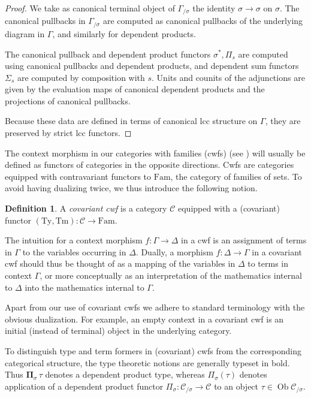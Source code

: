 \documentclass[a4paper]{article}
\theoremstyle{remark}
\theoremstyle{definition}
\newtheorem{definition}[theorem]{Definition}
\begin{document}
\begin{proof}
  We take as canonical terminal object of $\Gamma_{/ \sigma}$ the identity $\sigma \rightarrow \sigma$ on $\sigma$.
  The canonical pullbacks in $\Gamma_{/ \sigma}$ are computed as canonical pullbacks of the underlying diagram in $\Gamma$, and similarly for dependent products. 
  
  The canonical pullback and dependent product functors $\sigma^*, \Pi_s$ are computed using canonical pullbacks and dependent products, and dependent sum functors $\Sigma_s$ are computed by composition with $s$.
  Units and counits of the adjunctions are given by the evaluation maps of canonical dependent products and the projections of canonical pullbacks.

  Because these data are defined in terms of canonical lcc structure on $\Gamma$, they are preserved by strict lcc functors.
\end{proof}

The context morphism in our categories with families (cwfs) (see \cite{internal-type-theory}) will usually be defined as functors of categories in the opposite directions.
Cwfs are categories equipped with contravariant functors to $\mathrm{Fam}$, the category of families of sets.
To avoid having dualizing twice, we thus introduce the following notion.
\begin{definition}
  A \emph{covariant cwf} is a category $\mathcal{C}$ equipped with a (covariant) functor $(\mathrm{Ty}, \mathrm{Tm}) : \mathcal{C} \rightarrow \mathrm{Fam}$.
\end{definition}
The intuition for a context morphism $f : \Gamma \rightarrow \Delta$ in a cwf is an assignment of terms in $\Gamma$ to the variables occurring in $\Delta$.
Dually, a morphism $f : \Delta \rightarrow \Gamma$ in a covariant cwf should thus be thought of as a mapping of the variables in $\Delta$ to terms in context $\Gamma$, or more conceptually as an interpretation of the mathematics internal to $\Delta$ into the mathematics internal to $\Gamma$.

Apart from our use of covariant cwfs we adhere to standard terminology with the obvious dualization.
For example, an empty context in a covariant cwf is an initial (instead of terminal) object in the underlying category.

To distinguish type and term formers in (covariant) cwfs from the corresponding categorical structure, the type theoretic notions are generally typeset in bold.
Thus $\mathbf{\Pi}_\sigma \, \tau$ denotes a dependent product type, whereas $\Pi_\sigma(\tau)$ denotes application of a dependent product functor $\Pi_\sigma : \mathcal{C}_{/ \sigma} \rightarrow \mathcal{C}$ to an object $\tau \in \operatorname{Ob} \mathcal{C}_{/ \sigma}$.
\end{document}
